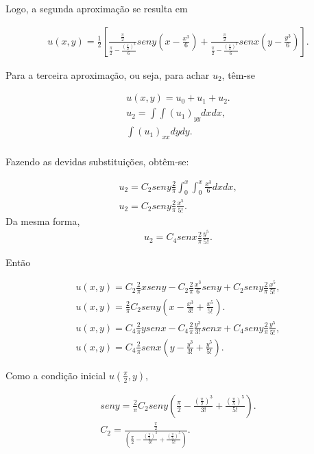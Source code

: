 Logo, a segunda aproximação se resulta em

\begin{gather}
u(x,y) = \frac{1}{2}\left[ \frac{\frac{\pi}{2}}{\frac{\pi}{2} - \frac{(\frac{\pi}{2})^3}{6}} seny\left(x - \frac{x^3}{6}\right) + \frac{\frac{\pi}{2}}{\frac{\pi}{2} - \frac{(\frac{\pi}{2})^3}{6}} senx\left(y - \frac{y^3}{6}\right)\right].
\end{gather}

Para a terceira aproximação, ou seja, para achar $u_{2}$, têm-se

\begin{gather}
u(x,y) = u_{0} + u_{1} + u_{2}.\nonumber\\
u_{2} = \int \int(u_{1})_{yy}dxdx,\nonumber\\
\int(u_{1})_{xx}dydy.\nonumber\\
\end{gather}


Fazendo as devidas substituições, obtêm-se:

\begin{gather}
u_{2} = C_{2}seny\frac{2}{\pi}\int_0^x \int_0^x \frac{x^3}{6}dxdx,\nonumber\\
u_{2} = C_{2}seny\frac{2}{\pi}\frac{x^5}{5!}.
\end{gather}
Da mesma forma,
\begin{gather}
u_{2} = C_{4}senx\frac{2}{\pi}\frac{y^5}{5!}.
\end{gather}

Então



\begin{gather}
u(x,y) = C_{2}\frac{2}{\pi}xseny - C_{2}\frac{2}{\pi}\frac{x^3}{6}seny + C_{2}seny\frac{2}{\pi}\frac{x^5}{5!},\nonumber\\
u(x,y) = \frac{2}{\pi}C_{2}seny\left(x - \frac{x^3}{3!} + \frac{x^5}{5!}\right).\nonumber\\
u(x,y) = C_{4}\frac{2}{\pi}ysenx - C_{4}\frac{2}{\pi}\frac{y^3}{3!}senx + C_{4}seny\frac{2}{\pi}\frac{y^5}{5!},\nonumber\\
u(x,y) = C_{4}\frac{2}{\pi}senx\left(y - \frac{y^3}{3!} + \frac{y^5}{5!}\right).
\end{gather}

Como a condição inicial $u\left(\frac{\pi}{2},y\right),$

\begin{gather}
seny = \frac{2}{\pi}C_{2}seny\left(\frac{\pi}{2}-\frac{(\frac{\pi}{2})^3}{3!} + \frac{(\frac{\pi}{5})^5}{5!}\right).\nonumber\\
C_{2} = \frac{\frac{\pi}{2}}{\left(\frac{\pi}{2}-\frac{(\frac{\pi}{2})^3}{3!} + \frac{(\frac{\pi}{5})^5}{5!}\right)}.
\end{gather}

